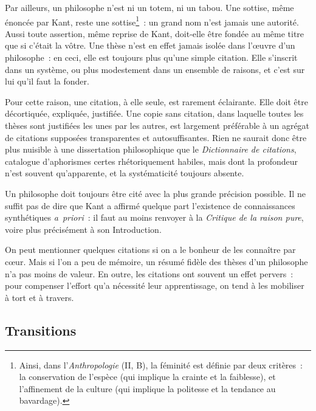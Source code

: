 \documentclass[a4paper,11pt]{article}
\newcommand{\apr}{\emph{a~priori}}
\begin{document}
\par

Par ailleurs, un philosophe n'est ni un totem, ni un tabou. Une sottise,
même énoncée par Kant, reste une sottise\footnote{Ainsi, dans
  l'\emph{Anthropologie} (II, B), la féminité est définie par deux
  critères~: la conservation de l'espèce (qui implique la crainte et la
  faiblesse), et l'affinement de la culture (qui implique la politesse
  et la tendance au bavardage).}~: un grand nom n'est jamais une
autorité. Aussi toute assertion, même reprise de Kant, doit-elle être
fondée au même titre que si c'était la vôtre.  Une thèse n'est en effet
jamais isolée dans l'œuvre d'un philosophe~: en ceci, elle est toujours
plus qu'une simple citation. Elle s'inscrit dans un système, ou plus
modestement dans un ensemble de raisons, et c'est sur lui qu'il faut la
fonder.

\par

Pour cette raison, une citation, à elle seule, est rarement
éclairante. Elle doit être décortiquée, expliquée, justifiée. Une copie
sans citation, dans laquelle toutes les thèses sont justifiées les unes
par les autres, est largement préférable à un agrégat de citations
supposées transparentes et autosuffisantes. Rien ne saurait donc être
plus nuisible à une dissertation philosophique que le \emph{Dictionnaire
  de citations}, catalogue d'aphorismes certes rhétoriquement habiles,
mais dont la profondeur n'est souvent qu'apparente, et la systématicité
toujours absente.

\par

Un philosophe doit toujours être cité avec la plus grande précision
possible. Il ne suffit pas de dire que Kant a affirmé quelque part
l'existence de connaissances synthétiques \apr{}~: il faut au moins
renvoyer à la \emph{Critique de la raison pure}, voire plus précisément
à son Introduction.

\par

On peut mentionner quelques citations si on a le bonheur de les
connaître par cœur. Mais si l'on a peu de mémoire, un résumé fidèle des
thèses d'un philosophe n'a pas moins de valeur. En outre, les citations
ont souvent un effet pervers~: pour compenser l'effort qu'a nécessité
leur apprentissage, on tend à les mobiliser à tort et à travers.


\subsection{Transitions}
\end{document}
